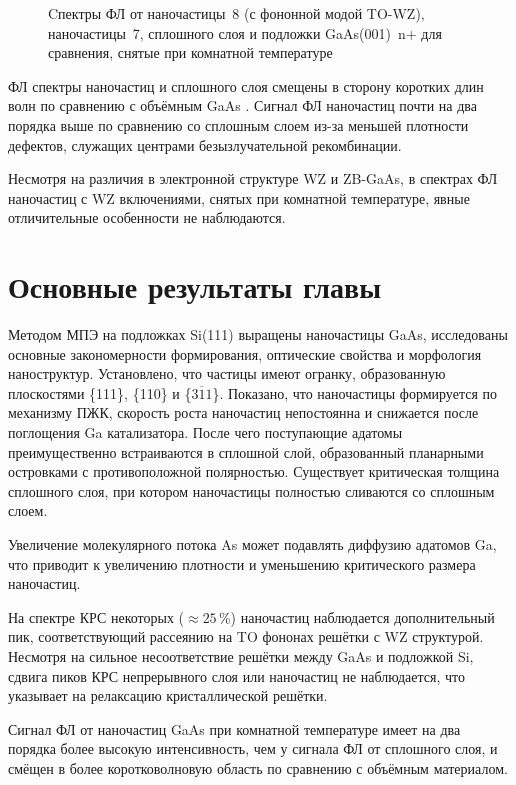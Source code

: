 \begin{figure}[ht]  \caption{Cпектры ФЛ от
		наночастицы~8 (с фононной модой TO-WZ), наночастицы~7, сплошного слоя и
		подложки GaAs(001)~n+ для сравнения, снятые при комнатной
температуре}\label{fig:Image_37} \end{figure}

ФЛ спектры наночастиц и сплошного слоя смещены в сторону коротких длин волн по
сравнению с объёмным GaAs \cite{Fu2004}. Сигнал ФЛ наночастиц почти на два
порядка выше по сравнению со сплошным слоем из-за меньшей плотности дефектов,
служащих центрами безызлучательной рекомбинации.

Несмотря на различия в электронной структуре WZ и ZB-GaAs, в спектрах ФЛ
наночастиц с WZ включениями, снятых при комнатной температуре, явные
отличительные особенности не наблюдаются.

\section{Основные результаты главы}\label{sec:ch5/sec3}

Методом МПЭ на подложках Si(111) выращены наночастицы GaAs, исследованы
основные закономерности формирования, оптические свойства и морфология
наноструктур. Установлено, что частицы имеют огранку, образованную плоскостями
\{111\}, \{110\} и \{\(3\overline{1}1\)\}. Показано, что наночастицы
формируется по механизму ПЖК, скорость роста наночастиц непостоянна и снижается
после поглощения Ga катализатора. После чего поступающие адатомы
преимущественно встраиваются в сплошной слой, образованный планарными
островками с противоположной полярностью. Существует критическая толщина
сплошного слоя, при котором наночастицы полностью сливаются со сплошным слоем.

Увеличение молекулярного потока As может подавлять диффузию адатомов Ga, что
приводит к увеличению плотности и уменьшению критического размера наночастиц.

На спектре КРС некоторых (\(\approx 25\)\,\%) наночастиц наблюдается
дополнительный пик, соответствующий рассеянию на TO фононах решётки с WZ
структурой. Несмотря на сильное несоответствие решётки между GaAs и подложкой
Si, сдвига пиков КРС непрерывного слоя или наночастиц не наблюдается, что
указывает на релаксацию кристаллической решётки.

Сигнал ФЛ от наночастиц GaAs при комнатной температуре имеет на два порядка
более высокую интенсивность, чем у сигнала ФЛ от сплошного слоя, и смёщен в
более коротковолновую область по сравнению с объёмным материалом.

\FloatBarrier

